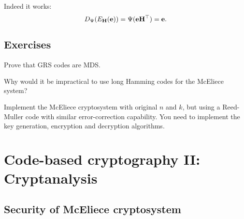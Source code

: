 \documentclass[a4paper, 11pt, openany]{book}
\begin{document}
Indeed it works:
\[
	D_\Psi( E_{\bf H}( {\bf e} ) ) = \Psi( {\bf e}{\bf H}^\top ) = {\bf e}.
\]



\subsection{Exercises}



\begin{exercise}
Prove that GRS codes are MDS.
\end{exercise}


\begin{exercise}
Why would it be impractical to use long Hamming codes for the McEliece system?
\end{exercise}

\begin{exercise}
Implement the McEliece cryptosystem with original $n$ and $k$, but using a Reed-Muller code with similar error-correction capability. You need to implement the key generation, encryption and decryption algorithms.
\end{exercise}


\section{Code-based cryptography II: Cryptanalysis}
\label{sec:30}





\subsection{Security of McEliece cryptosystem}

\end{document}
